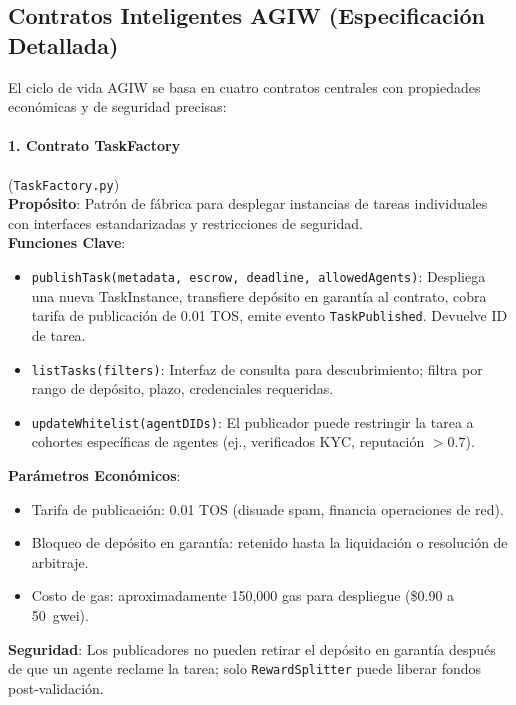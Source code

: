 \documentclass[11pt]{article}
\begin{document}
\subsection{Contratos Inteligentes AGIW (Especificación Detallada)}
\label{sec:agiw-contracts}
El ciclo de vida AGIW se basa en cuatro contratos centrales con propiedades económicas y de seguridad precisas:

\paragraph{1. Contrato TaskFactory} (\texttt{TaskFactory.py})\\
\textbf{Propósito}: Patrón de fábrica para desplegar instancias de tareas individuales con interfaces estandarizadas y restricciones de seguridad.\\
\textbf{Funciones Clave}:
\begin{itemize}[noitemsep]
  \item \texttt{publishTask(metadata, escrow, deadline, allowedAgents)}: Despliega una nueva TaskInstance, transfiere depósito en garantía al contrato, cobra tarifa de publicación de 0.01 TOS, emite evento \texttt{TaskPublished}. Devuelve ID de tarea.
  \item \texttt{listTasks(filters)}: Interfaz de consulta para descubrimiento; filtra por rango de depósito, plazo, credenciales requeridas.
  \item \texttt{updateWhitelist(agentDIDs)}: El publicador puede restringir la tarea a cohortes específicas de agentes (ej., verificados KYC, reputación $>0.7$).
\end{itemize}
\textbf{Parámetros Económicos}:
\begin{itemize}[noitemsep]
  \item Tarifa de publicación: 0.01 TOS (disuade spam, financia operaciones de red).
  \item Bloqueo de depósito en garantía: retenido hasta la liquidación o resolución de arbitraje.
  \item Costo de gas: aproximadamente 150,000 gas para despliegue (\$0.90 a 50~gwei).
\end{itemize}
\textbf{Seguridad}: Los publicadores no pueden retirar el depósito en garantía después de que un agente reclame la tarea; solo \texttt{RewardSplitter} puede liberar fondos post-validación.
\end{document}
